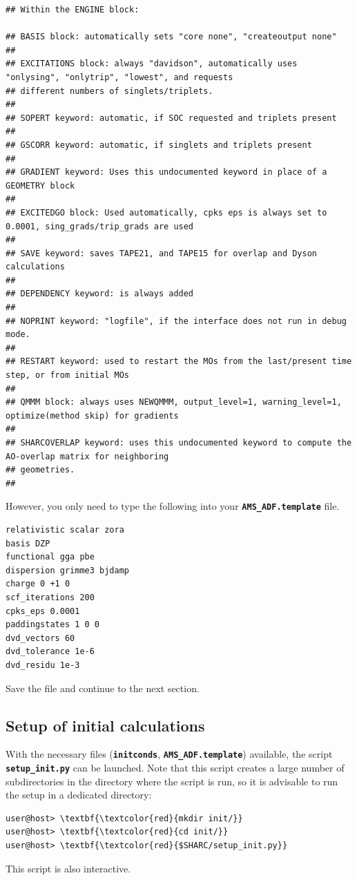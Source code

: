 \documentclass[a4paper,11pt,DIV=15,openany]{scrbook}
\makeatletter
\newcommand{\refermanual}[2][rectangle,draw=B,thick,fill=black!5,inner sep=1pt,outer sep=0pt,rounded corners]{\marginpar{\tikz[baseline=(current bounding box.north)]\node at (0,0) [#1]{\begin{tabular}{@{}l@{}}See\\ section\\ \ref*{#2}\\ (p. \pageref*{#2})\\ in the\\ manual.\end{tabular}};}}
\newcommand{\ttt}[1]{\textbf{\texttt{#1}}}
\makeatother
\begin{document}
\begin{oframed}
\begin{Verbatim}[commandchars=\\\{\}]
## Within the ENGINE block:

## BASIS block: automatically sets "core none", "createoutput none"
##
## EXCITATIONS block: always "davidson", automatically uses "onlysing", "onlytrip", "lowest", and requests 
## different numbers of singlets/triplets.
##
## SOPERT keyword: automatic, if SOC requested and triplets present
##
## GSCORR keyword: automatic, if singlets and triplets present
##
## GRADIENT keyword: Uses this undocumented keyword in place of a GEOMETRY block
##
## EXCITEDGO block: Used automatically, cpks eps is always set to 0.0001, sing_grads/trip_grads are used 
##
## SAVE keyword: saves TAPE21, and TAPE15 for overlap and Dyson calculations
##
## DEPENDENCY keyword: is always added
##
## NOPRINT keyword: "logfile", if the interface does not run in debug mode.
##
## RESTART keyword: used to restart the MOs from the last/present time step, or from initial MOs
##
## QMMM block: always uses NEWQMMM, output_level=1, warning_level=1, optimize(method skip) for gradients
##
## SHARCOVERLAP keyword: uses this undocumented keyword to compute the AO-overlap matrix for neighboring 
## geometries.
##
\end{Verbatim}
\end{oframed}

However, you only need to type the following into your \ttt{AMS_ADF.template} file.
\begin{oframed}
  \begin{Verbatim}[commandchars=\\\{\}]
relativistic scalar zora 
basis DZP
functional gga pbe
dispersion grimme3 bjdamp
charge 0 +1 0
scf_iterations 200
cpks_eps 0.0001
paddingstates 1 0 0
dvd_vectors 60
dvd_tolerance 1e-6
dvd_residu 1e-3
  \end{Verbatim}
\end{oframed}

\normalsize
Save the file and continue to the next section.

\clearpage
\subsection{Setup of initial calculations}
\refermanual{m-sec:molcas_input.py}

With the necessary files (\ttt{initconds}, \ttt{AMS_ADF.template}) available, the script \ttt{setup\_init.py} can be launched.
Note that this script creates a large number of subdirectories in the directory where the script is run, so it is advisable to run the setup in a dedicated directory:
\begin{Verbatim}[commandchars=\\\{\}]
user@host> \textbf{\textcolor{red}{mkdir init/}}
user@host> \textbf{\textcolor{red}{cd init/}}
user@host> \textbf{\textcolor{red}{$SHARC/setup_init.py}}
\end{Verbatim}
This script is also interactive. 
\end{document}
